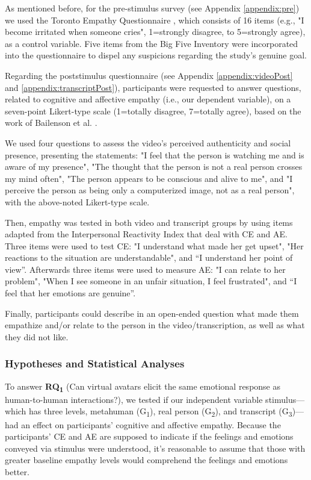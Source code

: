 As mentioned before, for the pre-stimulus survey (see Appendix \ref{appendix:pre}) we used the Toronto Empathy Questionnaire \cite{SPR03}, which consists of 16 items (e.g., "I become irritated when someone cries", 1=strongly disagree, to 5=strongly agree), as a control variable. Five items from the Big Five Inventory \cite{JOH91} were incorporated into the questionnaire to dispel any suspicions regarding the study's genuine goal.

Regarding the poststimulus questionnaire (see Appendix \ref{appendix:videoPost} and \ref{appendix:transcriptPost}), participants were requested to answer questions, related to cognitive and affective empathy (i.e., our dependent variable), on a seven-point Likert-type scale (1=totally disagree, 7=totally agree), based on the work of Bailenson et al. \cite{BAI03}.

We used four questions to assess the video's perceived authenticity and social presence, presenting the statements: "I feel that the person is watching me and is aware of my presence", "The thought that the person is not a real person crosses my mind often", "The person appears to be conscious and alive to me", and "I perceive the person as being only a computerized image, not as a real person", with the above-noted Likert-type scale.

Then, empathy was tested in both video and transcript groups by using items adapted from the Interpersonal Reactivity Index \cite{DAV83} that deal with CE and AE. Three items were used to test CE: "I understand what made her get upset", "Her reactions to the situation are understandable", and “I understand her point of view”. Afterwards three items were used to measure AE: "I can relate to her problem", "When I see someone in an unfair situation, I feel frustrated", and “I feel that her emotions are genuine”.

Finally, participants could describe in an open-ended question what made them empathize and/or relate to the person in the video/transcription, as well as what they did not like.

\subsubsection{Hypotheses and Statistical Analyses}
To answer \textbf{RQ\textsubscript{1}} (Can virtual avatars elicit the same emotional response as human-to-human interactions?), we tested if our independent variable stimulus---which has three levels, metahuman (G\textsubscript{1}), real person (G\textsubscript{2}), and transcript (G\textsubscript{3})---had an effect on participants' cognitive and affective empathy. Because the participants' CE and AE are supposed to indicate if the feelings and emotions conveyed via stimulus were understood, it's reasonable to assume that those with greater baseline empathy levels would comprehend the feelings and emotions better.

